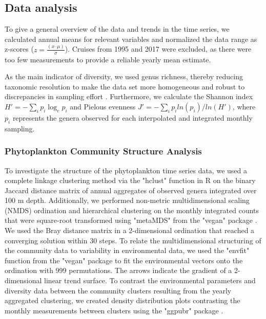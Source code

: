 \documentclass[draft]{agujournal2019}
\begin{document}
\subsection{Data analysis}    
    To give a general overview of the data and trends in the time series, we calculated annual means for relevant variables and normalized the data range as z-scores ($z = \frac{(x – \mu)}{\sigma}$). Cruises from 1995 and 2017 were excluded, as there were too few measurements to provide a reliable yearly mean estimate. 
    
    As the main indicator of diversity, we used genus richness, thereby reducing taxonomic resolution to make the data set more homogeneous and robust to discrepancies in sampling effort \cite{ptacnik_diversity_2008}. Furthermore, we calculate the Shannon index $H' = -\sum_i p_i \log_{e} p_i$ and Pielou\textquotesingle s evenness $J' = -\sum_i p_i ln( p_i )/ln(H')$, where $p_i$ represents the genera observed for each interpolated and integrated monthly sampling. 

      
    \subsubsection{Phytoplankton Community Structure Analysis}
    To investigate the structure of the phytoplankton time series data, we used a complete linkage clustering method via the "hclust" function in R \cite{r_core_team_r_2024} on the binary Jaccard distance matrix of annual aggregates of observed genera integrated over 100 m depth. Additionally, we performed non-metric multidimensional scaling (NMDS) ordination and hierarchical clustering on the monthly integrated counts that were square-root transformed using "metaMDS" from the "vegan" package \cite{oksanen_vegan_2024}. We used the Bray distance matrix in a 2-dimensional ordination that reached a converging solution within 30 steps. To relate the multidimensional structuring of the community data to variability in environmental data, we used the "envfit" function from the "vegan" package to fit the environmental vectors onto the ordination with 999 permutations. The arrows indicate the gradient of a 2-dimensional linear trend surface. 
    To contrast the environmental parameters and diversity data between the community clusters resulting from the yearly aggregated clustering, we created density distribution plots contrasting the monthly measurements between clusters using the "ggpubr" package \cite{kassambara_ggpubr_2023}. %
\end{document}
